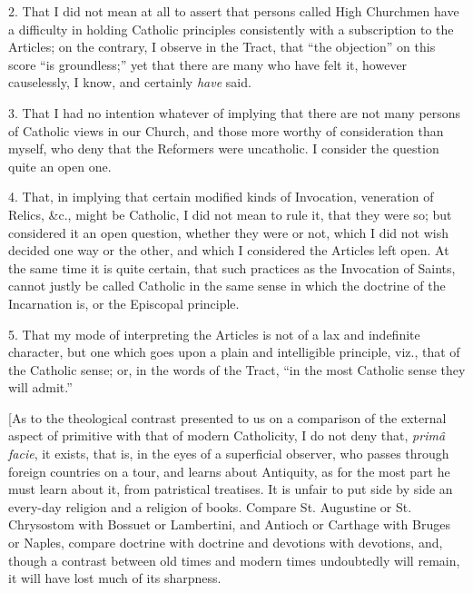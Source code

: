 2. That I did not mean at all to assert that
persons called High Churchmen have a difficulty in holding Catholic
principles consistently with a subscription to the Articles; on the
contrary, I observe in the Tract, that ``the objection'' on this score ``is
groundless;'' yet that there are many who have felt it, however
causelessly, I know, and certainly \emph{have} said.

3. That I had no intention whatever of implying
that there are not many persons of Catholic views in our Church, and
those more worthy of consideration than myself, who deny that the
Reformers were uncatholic. I consider the question quite an open one.

4. That, in implying that certain modified kinds
of Invocation, veneration of Relics, \&c., might be Catholic, I did
not mean to rule it, that they were so; but considered it an open
question, whether they were or not, which I did not wish decided one
way or the other, and which I considered the Articles left open. At
the same time it is quite certain, that such practices as the
Invocation of Saints, cannot justly be called Catholic in the same
sense in which the doctrine of the Incarnation is, or the Episcopal
principle.

5. That my mode of interpreting the Articles is
not of a lax and indefinite character, but one which goes upon a plain
and intelligible principle, viz., that of the Catholic sense; or, in
the words of the Tract, ``in the most Catholic sense they will admit.''


[As to the theological contrast presented to us
on a comparison of the external aspect of primitive with that of
modern Catholicity, I do not deny that, \emph{primâ facie}, it
exists, that is, in the eyes of a superficial observer, who passes
through foreign countries on a tour, and learns about Antiquity, as
for the most part he must learn about it, from patristical treatises.
It is unfair to put side by side an every-day religion and a religion
of books. Compare St. Augustine or St. Chrysostom with Bossuet or
Lambertini, and Antioch or Carthage with Bruges or Naples, compare
doctrine with doctrine and devotions with devotions, and, though a
contrast between old times and modern times undoubtedly will remain,
it will have lost much of its sharpness.


